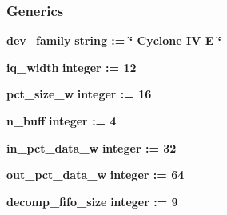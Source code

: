 \subsubsection*{Generics}
 \begin{DoxyCompactItemize}
\item 
{\bf dev\+\_\+family} {\bfseries {\bfseries \textcolor{comment}{string}\textcolor{vhdlchar}{ }\textcolor{vhdlchar}{ }\textcolor{vhdlchar}{\+:}\textcolor{vhdlchar}{=}\textcolor{vhdlchar}{ }\textcolor{vhdlchar}{ }\textcolor{vhdlchar}{ }\textcolor{vhdlchar}{ }\textcolor{keyword}{\char`\"{} Cyclone I\+V E \char`\"{}}\textcolor{vhdlchar}{ }}}
\item 
{\bf iq\+\_\+width} {\bfseries {\bfseries \textcolor{comment}{integer}\textcolor{vhdlchar}{ }\textcolor{vhdlchar}{ }\textcolor{vhdlchar}{\+:}\textcolor{vhdlchar}{=}\textcolor{vhdlchar}{ }\textcolor{vhdlchar}{ } \textcolor{vhdldigit}{12} \textcolor{vhdlchar}{ }}}
\item 
{\bf pct\+\_\+size\+\_\+w} {\bfseries {\bfseries \textcolor{comment}{integer}\textcolor{vhdlchar}{ }\textcolor{vhdlchar}{ }\textcolor{vhdlchar}{\+:}\textcolor{vhdlchar}{=}\textcolor{vhdlchar}{ }\textcolor{vhdlchar}{ } \textcolor{vhdldigit}{16} \textcolor{vhdlchar}{ }}}
\item 
{\bf n\+\_\+buff} {\bfseries {\bfseries \textcolor{comment}{integer}\textcolor{vhdlchar}{ }\textcolor{vhdlchar}{ }\textcolor{vhdlchar}{\+:}\textcolor{vhdlchar}{=}\textcolor{vhdlchar}{ }\textcolor{vhdlchar}{ } \textcolor{vhdldigit}{4} \textcolor{vhdlchar}{ }}}
\item 
{\bf in\+\_\+pct\+\_\+data\+\_\+w} {\bfseries {\bfseries \textcolor{comment}{integer}\textcolor{vhdlchar}{ }\textcolor{vhdlchar}{ }\textcolor{vhdlchar}{\+:}\textcolor{vhdlchar}{=}\textcolor{vhdlchar}{ }\textcolor{vhdlchar}{ } \textcolor{vhdldigit}{32} \textcolor{vhdlchar}{ }}}
\item 
{\bf out\+\_\+pct\+\_\+data\+\_\+w} {\bfseries {\bfseries \textcolor{comment}{integer}\textcolor{vhdlchar}{ }\textcolor{vhdlchar}{ }\textcolor{vhdlchar}{\+:}\textcolor{vhdlchar}{=}\textcolor{vhdlchar}{ }\textcolor{vhdlchar}{ } \textcolor{vhdldigit}{64} \textcolor{vhdlchar}{ }}}
\item 
{\bf decomp\+\_\+fifo\+\_\+size} {\bfseries {\bfseries \textcolor{comment}{integer}\textcolor{vhdlchar}{ }\textcolor{vhdlchar}{ }\textcolor{vhdlchar}{\+:}\textcolor{vhdlchar}{=}\textcolor{vhdlchar}{ }\textcolor{vhdlchar}{ } \textcolor{vhdldigit}{9} \textcolor{vhdlchar}{ }}}
\end{DoxyCompactItemize}
